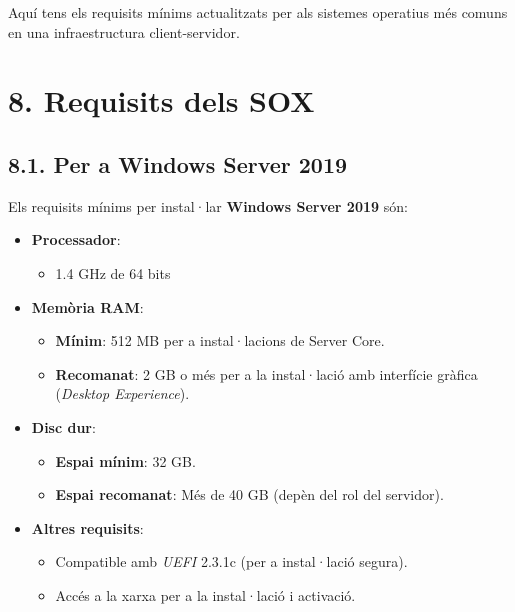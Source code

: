 \documentclass[
  a4paper,
]{article}
\providecommand{\tightlist}{%
  \setlength{\itemsep}{0pt}\setlength{\parskip}{0pt}}
\begin{document}
Aquí tens els requisits mínims actualitzats per als sistemes operatius
més comuns en una infraestructura client-servidor.

\section{8. Requisits dels SOX}\label{requisits-dels-sox}

\subsection{8.1. Per a Windows Server
2019}\label{per-a-windows-server-2019}

Els requisits mínims per instal·lar \textbf{Windows Server 2019} són:

\begin{itemize}
\tightlist
\item
  \textbf{Processador}:

  \begin{itemize}
  \tightlist
  \item
    1.4 GHz de 64 bits
  \end{itemize}
\item
  \textbf{Memòria RAM}:

  \begin{itemize}
  \tightlist
  \item
    \textbf{Mínim}: 512 MB per a instal·lacions de Server Core.
  \item
    \textbf{Recomanat}: 2 GB o més per a la instal·lació amb interfície
    gràfica (\emph{Desktop Experience}).
  \end{itemize}
\item
  \textbf{Disc dur}:

  \begin{itemize}
  \tightlist
  \item
    \textbf{Espai mínim}: 32 GB.
  \item
    \textbf{Espai recomanat}: Més de 40 GB (depèn del rol del servidor).
  \end{itemize}
\item
  \textbf{Altres requisits}:

  \begin{itemize}
  \tightlist
  \item
    Compatible amb \emph{UEFI} 2.3.1c (per a instal·lació segura).
  \item
    Accés a la xarxa per a la instal·lació i activació.
  \end{itemize}
\end{itemize}
\end{document}
